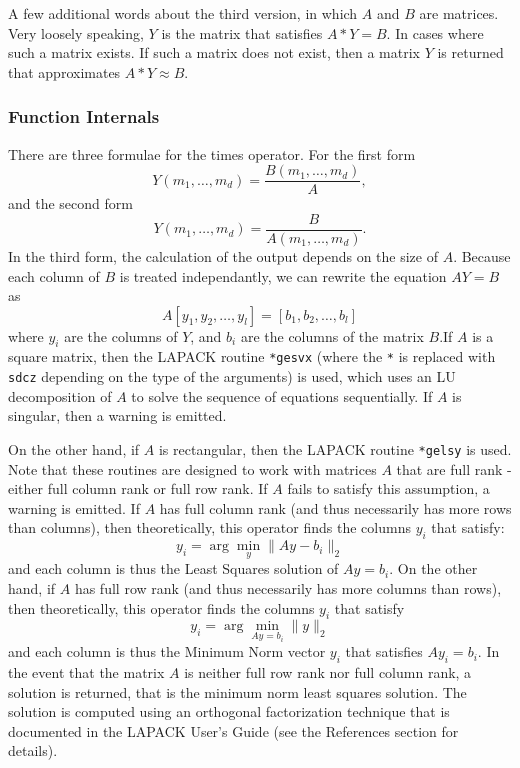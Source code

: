 A few additional words about the third version, in which $A$ and $B$ are matrices.  Very loosely speaking, $Y$ is the matrix that satisfies $A * Y = B$.  In cases where such a matrix exists.  If such a matrix does not exist, then a matrix $Y$ is returned that approximates $A * Y \approx B$.
\subsubsection{Function Internals}
There are three formulae for the times operator.  For the first form
\[
Y(m_1,\ldots,m_d) = \frac{B(m_1,\ldots,m_d)}{A},
\]
and the second form
\[
Y(m_1,\ldots,m_d) = \frac{B}{A(m_1,\ldots,m_d)}.
\]
In the third form, the calculation of the output depends on the size of $A$. Because each column of $B$ is treated independantly, we can rewrite the equation $A Y = B$ as
\[
  A [y_1, y_2,\ldots, y_l] = [b_1, b_2, \ldots, b_l]
\]
where $y_i$ are the columns of $Y$, and $b_i$ are the columns of the matrix $B$.If $A$ is a square matrix, then the LAPACK routine \verb|*gesvx| (where the \verb|*| is replaced with \verb|sdcz| depending on the type of the arguments) is used, which uses an LU decomposition of $A$ to solve the sequence of equations sequentially.  If $A$ is singular, then a warning is emitted. 

On the other hand, if $A$ is rectangular, then the LAPACK routine \verb|*gelsy| is used.  Note that these routines are designed to work with matrices $A$ that are full rank - either full column rank or full row rank.  If $A$ fails to satisfy this assumption, a warning is emitted.  If $A$ has full column rank (and thus necessarily has more rows than columns), then theoretically, this operator finds the columns $y_i$ that satisfy:
\[
  y_i = \arg \min_y \| A y - b_i \|_2
\]
and each column is thus the Least Squares solution of $A y = b_i$.  On the other hand, if $A$ has full row rank (and thus necessarily has more columns than rows), then theoretically, this operator finds the columns $y_i$ that satisfy
\[
  y_i = \arg \min_{A y = b_i} \| y \|_2
\]
and each column is thus the Minimum Norm vector $y_i$ that satisfies $A y_i = b_i$.  
In the event that the matrix $A$ is neither full row rank nor full column rank, a solution is returned, that is the minimum norm least squares solution.  The solution is computed using an orthogonal factorization technique that is documented in the LAPACK User's Guide (see the References section for details).
